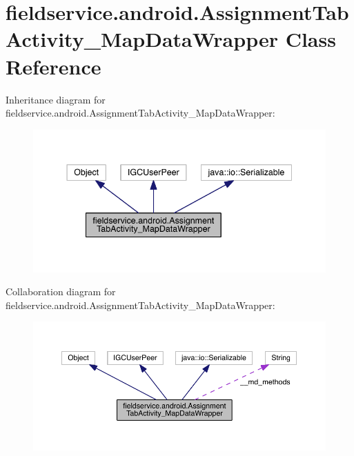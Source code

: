 \hypertarget{classfieldservice_1_1android_1_1_assignment_tab_activity___map_data_wrapper}{\section{fieldservice.\+android.\+Assignment\+Tab\+Activity\+\_\+\+Map\+Data\+Wrapper Class Reference}
\label{classfieldservice_1_1android_1_1_assignment_tab_activity___map_data_wrapper}
}


Inheritance diagram for fieldservice.\+android.\+Assignment\+Tab\+Activity\+\_\+\+Map\+Data\+Wrapper\+:
\nopagebreak
\begin{figure}[H]
\begin{center}
\leavevmode
\includegraphics[width=340pt]{classfieldservice_1_1android_1_1_assignment_tab_activity___map_data_wrapper__inherit__graph}
\end{center}
\end{figure}


Collaboration diagram for fieldservice.\+android.\+Assignment\+Tab\+Activity\+\_\+\+Map\+Data\+Wrapper\+:
\nopagebreak
\begin{figure}[H]
\begin{center}
\leavevmode
\includegraphics[width=350pt]{classfieldservice_1_1android_1_1_assignment_tab_activity___map_data_wrapper__coll__graph}
\end{center}
\end{figure}
